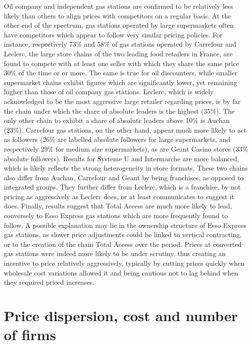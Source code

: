\documentclass[english]{article}
\begin{document}
Oil company and independent gas stations are confirmed to be relatively less likely than others to align prices with competitors on a regular basis. At the other end of the spectrum, gas stations operated by large supermarkets often have competitors which appear to follow very similar pricing policies. For instance, respectively 73\% and 58\% of gas stations operated by Carrefour and Leclerc, the large store chains of the two leading food retailers in France, are found to compete with at least one seller with which they share the same price 30\% of the time or or more. The same is true for oil discounters, while smaller supermarket chains exhibit figures which are significantly lower, yet remaining higher than those of oil company gas stations.
Leclerc, which is widely acknowledged to be the most aggressive large retailer regarding prices, is by far the chain under which the share of absolute leaders is the highest (35\%). The only other chain to exhibit a share of absolute leaders above 10\% is Auchan (23\%). Carrefour gas stations, on the other hand, appear much more likely to act as followers (26\% are labelled absolute followers for large supermarkets, and respectively 29\% for medium size supermarkets), as are Geant Casino stores (33\% absolute followers). Results for Systeme U and Intermarche are more balanced, which is likely reflects the strong heterogeneity in store formats. These two chains also differ from Auchan, Carrefour and Geant by being franchises, as opposed to integrated groups. They further differ from Leclerc, which is a franchise, by not pricing as aggressively as Leclerc does, or at least communicates to suggest it does. Finally, results suggest that Total Access are much more likely to lead, conversely to Esso Express gas stations which are more frequently found to follow. A possible explanation may lie in the ownership structure of Esso Express gas stations, as slower price adjustments could be linked to vertical contracting, or to the creation of the chain Total Access over the period. Prices at converted gas stations were indeed more likely to be under scrutiny, thus creating an incentive to price relatively aggressively, typically by cutting prices quickly when wholesale cost variations allowed it and being cautious not to lag behind when they required priced increases.

\section{Price dispersion, cost and number of firms}
\end{document}

